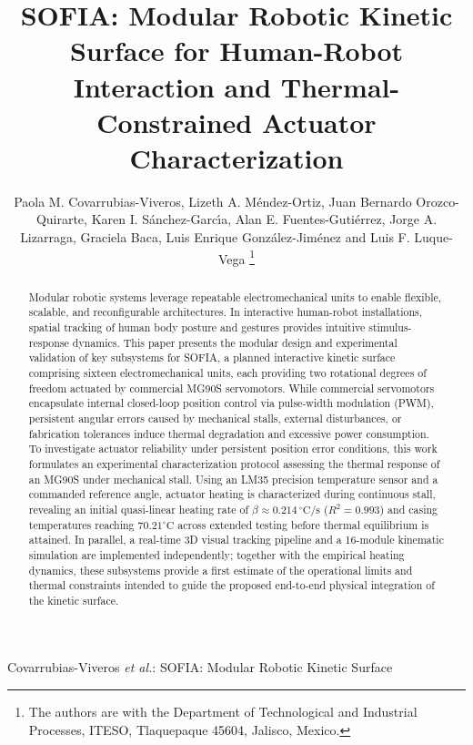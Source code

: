 \documentclass[lettersize,journal]{IEEEtran}
\begin{document}
	
	\title{SOFIA: Modular Robotic Kinetic Surface for Human-Robot Interaction and Thermal-Constrained Actuator Characterization}
	
	\author{Paola M. Covarrubias-Viveros, Lizeth A. M{\'e}ndez-Ortiz, Juan Bernardo Orozco-Quirarte, Karen I. S{\'a}nchez-Garc{\'\i}a, Alan E. Fuentes-Guti{\'e}rrez, Jorge A. Lizarraga, Graciela Baca, Luis Enrique Gonz{\'a}lez-Jim{\'e}nez and Luis F. Luque-Vega
		\thanks{The authors are with the Department of Technological and
			Industrial Processes, ITESO, Tlaquepaque 45604, Jalisco, Mexico.}}
	
	{Covarrubias-Viveros \MakeLowercase{\textit{et al.}}: SOFIA: Modular Robotic Kinetic Surface}
	
	\maketitle
	
	\begin{abstract}
		Modular robotic systems leverage repeatable electromechanical units to enable flexible, scalable, and reconfigurable architectures. In interactive human-robot installations, spatial tracking of human body posture and gestures provides intuitive stimulus-response dynamics. This paper presents the modular design and experimental validation of key subsystems for SOFIA, a planned interactive kinetic surface comprising sixteen electromechanical units, each providing two rotational degrees of freedom actuated by commercial MG90S servomotors. While commercial servomotors encapsulate internal closed-loop position control via pulse-width modulation (PWM), persistent angular errors caused by mechanical stalls, external disturbances, or fabrication tolerances induce thermal degradation and excessive power consumption. To investigate actuator reliability under persistent position error conditions, this work formulates an experimental characterization protocol assessing the thermal response of an MG90S under mechanical stall. Using an LM35 precision temperature sensor and a commanded reference angle, actuator heating is characterized during continuous stall, revealing an initial quasi-linear heating rate of $\beta \approx 0.214\,^\circ\text{C/s}$ ($R^2 = 0.993$) and casing temperatures reaching $70.21^\circ\text{C}$ across extended testing before thermal equilibrium is attained. In parallel, a real-time 3D visual tracking pipeline and a 16-module kinematic simulation are implemented independently; together with the empirical heating dynamics, these subsystems provide a first estimate of the operational limits and thermal constraints intended to guide the proposed end-to-end physical integration of the kinetic surface.
	\end{abstract}
	
\end{document}
